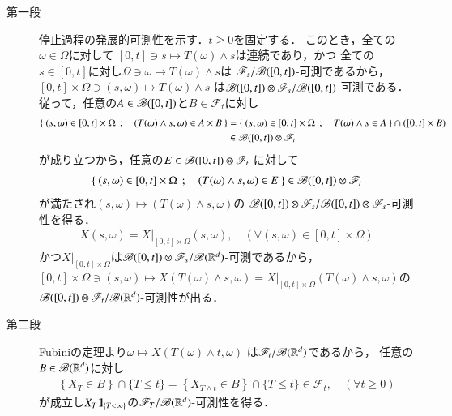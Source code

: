 	\begin{prf}\mbox{}
		\begin{description}
			\item[第一段]
				停止過程の発展的可測性を示す．$t \geq 0$を固定する．
				このとき，全ての$\omega \in \Omega$に対して
				$[0,t] \ni s \longmapsto T(\omega) \wedge s$は連続であり，かつ
				全ての$s \in [0,t]$に対し$\Omega \ni \omega \longmapsto T(\omega) \wedge s$は
				$\mathscr{F}_s/\mathscr{B}([0,t])$-可測であるから，
				$[0,t] \times \Omega \ni (s,\omega) \longmapsto T(\omega) \wedge s$
				は$\mathscr{B}([0,t]) \otimes \mathscr{F}_s/\mathscr{B}([0,t])$-可測である．
				従って，任意の$A \in \mathscr{B}([0,t])$と$B \in \mathscr{F}_t$に対し
				\begin{align}
					\left\{\ (s,\omega) \in [0,t] \times \Omega\ \, ; \quad (T(\omega) \wedge s,\omega) \in A \times B\ \right\}
					&= \left\{\ (s,\omega) \in [0,t] \times \Omega\ \, ; \quad T(\omega) \wedge s \in A\ \right\}
					\cap ([0,t] \times B) \\
					&\in \mathscr{B}([0,t]) \otimes \mathscr{F}_t
				\end{align}
				が成り立つから，任意の$E \in \mathscr{B}([0,t]) \otimes \mathscr{F}_t$
				に対して
				\begin{align}
					\left\{\ (s,\omega) \in [0,t] \times \Omega\ \, ; \quad (T(\omega) \wedge s,\omega) \in E\ \right\} 
					\in \mathscr{B}([0,t]) \otimes \mathscr{F}_t
				\end{align}
				が満たされ$(s,\omega) \longmapsto (T(\omega) \wedge s,\omega)$の
				$\mathscr{B}([0,t]) \otimes \mathscr{F}_s/\mathscr{B}([0,t]) \otimes \mathscr{F}_s$-可測性を得る．
				\begin{align}
					X(s,\omega) = X|_{[0,t] \times \Omega}(s,\omega),
					\quad (\forall (s,\omega) \in [0,t] \times \Omega)
				\end{align}
				かつ$X|_{[0,t] \times \Omega}$は$\mathscr{B}([0,t]) \otimes \mathscr{F}_s/\mathscr{B}(\mathbb{R}^d)$-可測であるから，
				$[0,t] \times \Omega \ni (s,\omega) \longmapsto X(T(\omega) \wedge s,\omega) 
				= X|_{[0,t] \times \Omega}(T(\omega) \wedge s,\omega)$の
				$\mathscr{B}([0,t]) \otimes \mathscr{F}_t/\mathscr{B}(\mathbb{R}^d)$-可測性が出る．
				
			\item[第二段]
				Fubiniの定理より$\omega \longmapsto X(T(\omega) \wedge t,\omega)$
				は$\mathscr{F}_t/\mathscr{B}(\mathbb{R}^d)$であるから，
				任意の$B \in \mathscr{B}(\mathbb{R}^d)$に対し
				\begin{align}
					\left\{ X_T \in B \right\} \cap \{T \leq t\}
					= \left\{ X_{T \wedge t} \in B \right\} \cap \{T \leq t\}
					\in \mathscr{F}_t,
					\quad (\forall t \geq 0)
				\end{align}
				が成立し$X_T \mbox{1}\hspace{-0.25em}\mbox{l}_{\{T < \infty\}}$の$\mathscr{F}_T/\mathscr{B}(\mathbb{R}^d)$-可測性を得る．
				\QED
		\end{description}
	\end{prf}
	
